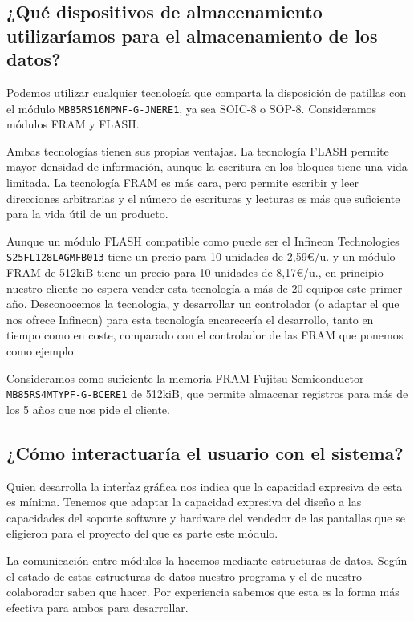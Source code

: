 \subsection{¿Qué dispositivos de almacenamiento utilizaríamos para el almacenamiento de los datos?}

Podemos utilizar cualquier tecnología que comparta la disposición de patillas con el módulo \linebreak \texttt{MB85RS16NPNF-G-JNERE1},
ya sea SOIC-8 o SOP-8. Consideramos módulos FRAM y FLASH.

Ambas tecnologías tienen sus propias ventajas. La tecnología FLASH permite mayor densidad de información,
aunque la escritura en los bloques tiene una vida limitada. La tecnología FRAM es más cara, pero permite
escribir y leer direcciones arbitrarias y el número de escrituras y lecturas es más que suficiente para la vida
útil de un producto.

Aunque un módulo FLASH compatible como puede ser el Infineon Technologies \linebreak \texttt{S25FL128LAGMFB013} tiene un
precio para 10 unidades de 2,59€/u. y un módulo FRAM de 512kiB tiene un precio para 10 unidades de
8,17€/u., en principio nuestro cliente no espera vender esta tecnología a más de 20 equipos este primer año.
Desconocemos la tecnología, y desarrollar un controlador (o adaptar el que nos ofrece Infineon) para esta tecnología
encarecería el desarrollo, tanto en tiempo como en coste, comparado con el controlador de las FRAM que ponemos como ejemplo.

Consideramos como suficiente la memoria FRAM Fujitsu Semiconductor \linebreak \texttt{MB85RS4MTYPF-G-BCERE1} de 512kiB,
que permite almacenar registros para más de los 5 años que nos pide el cliente.

\subsection{¿Cómo interactuaría el usuario con el sistema?}

Quien desarrolla la interfaz gráfica nos indica que la capacidad
expresiva de esta es mínima. Tenemos que adaptar la capacidad
expresiva del diseño a las capacidades del soporte software y
hardware del vendedor de las pantallas que se eligieron para el proyecto
del que es parte este módulo.

La comunicación entre módulos la hacemos mediante estructuras de datos.
Según el estado de estas estructuras de datos nuestro programa y el de
nuestro colaborador saben que hacer. Por experiencia sabemos que esta
es la forma más efectiva para ambos para desarrollar.

